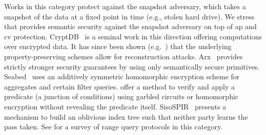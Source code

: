 			Works in this category protect against the snapshot adversary, which takes a snapshot of the data at a fixed point in time (e.g., stolen hard drive).
			We stress that \epsolute{} provides semantic security against the snapshot adversary on top of \acrshort{ap} and \acrshort{cv} protection.
			CryptDB~\cite{crypt-db} is a seminal work in this direction offering computations over encrypted data.
			It has since been shown (e.g.~\cite{inference-attacks-naveed-15,inference-attack-islam-14,attacks-tao-of-inference}) that the underlying property-preserving schemes allow for reconstruction attacks.
			Arx~\cite{arx} provides strictly stronger security guarantees by using only semantically secure primitives.
			Seabed~\cite{seabed} uses an additively symmetric homomorphic encryption scheme for aggregates and certain filter queries.
			\textcite{ppqed} offer a method to verify and apply a predicate (a junction of conditions) using garbled circuits or homomorphic encryption without revealing the predicate itself.
			SisoSPIR~\cite{sisospir} presents a mechanism to build an oblivious index tree such that neither party learns the pass taken.
			See \cite{ore-benchmark-17} for a survey of range query protocols in this category. %
